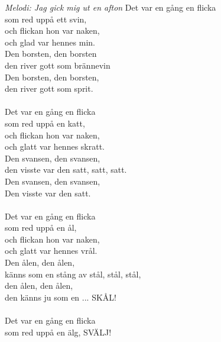 {\footnotesize\textit{Melodi: Jag gick mig ut en afton}}
\vspace{10pt}
Det var en gång en flicka \\
som red uppå ett svin, \\
och flickan hon var naken,\\ 
och glad var hennes min. \\
Den borsten, den borsten \\
den river gott som brännevin \\
Den borsten, den borsten, \\
den river gott som sprit.\\
\\
Det var en gång en flicka \\
som red uppå en katt, \\
och flickan hon var naken,\\ 
och glatt var hennes skratt.\\ 
Den svansen, den svansen, \\
den visste var den satt, satt, satt.\\ 
Den svansen, den svansen, \\
Den visste var den satt.\\
\\
Det var en gång en flicka \\
som red uppå en ål, \\
och flickan hon var naken,\\ 
och glatt var hennes vrål. \\
Den ålen, den ålen, \\
känns som en stång av stål, stål, stål,\\ 
den ålen, den ålen, \\
den känns ju som en ... SKÅL!\\
\\
Det var en gång en flicka \\
som red uppå en älg, SVÄLJ!

